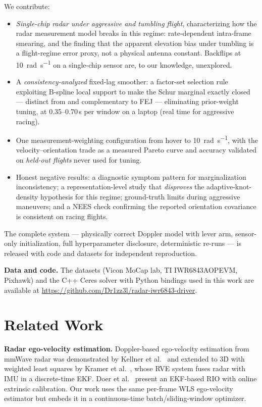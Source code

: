 \documentclass[conference]{IEEEtran}
\begin{document}
We contribute:
\begin{itemize}
  \item \emph{Single-chip radar under aggressive and tumbling flight},
        characterizing how the radar measurement model breaks in this
        regime: rate-dependent intra-frame smearing, and the finding
        that the apparent elevation bias under tumbling is a
        flight-regime error proxy, not a physical antenna constant.
        Backflips at \SI{10}{\radian\per\second} on a single-chip
        sensor are, to our knowledge, unexplored.
  \item A \emph{consistency-analyzed} fixed-lag smoother: a factor-set
        selection rule exploiting B-spline local support to make the
        Schur marginal exactly closed --- distinct from and
        complementary to FEJ --- eliminating prior-weight tuning, at
        0.35--0.70\,s per window on a laptop (real time for aggressive
        racing).
  \item One measurement-weighting configuration from hover to
        \SI{10}{\radian\per\second}, with the velocity--orientation
        trade as a measured Pareto curve and accuracy validated on
        \emph{held-out flights} never used for tuning.
  \item Honest negative results: a diagnostic symptom pattern for
        marginalization inconsistency; a representation-level study
        that \emph{disproves} the adaptive-knot-density hypothesis for
        this regime; ground-truth limits during aggressive maneuvers;
        and a NEES check confirming the reported orientation covariance
        is consistent on racing flights.
\end{itemize}
The complete system --- physically correct Doppler model with lever
arm, sensor-only initialization, full hyperparameter disclosure,
deterministic re-runs --- is released with code and datasets for
independent reproduction.

\textbf{Data and code.}
The datasets (Vicon MoCap lab, TI IWR6843AOPEVM, Pixhawk) and the
C++ Ceres solver with Python bindings used in this work are available
at \url{https://github.com/Dr1zz3l/radar-iwr6843-driver}.

\section{Related Work}
\label{sec:related}

\textbf{Radar ego-velocity estimation.}
Doppler-based ego-velocity estimation from mmWave radar was
demonstrated by Kellner et al.~\cite{kellner2014instantaneous} and
extended to 3D with weighted least squares by
Kramer et al.~\cite{kramer2020rve}, whose RVE system fuses radar
with IMU in a discrete-time EKF.  Doer et
al.~\cite{doer2020ekf} present an EKF-based RIO with online
extrinsic calibration. Our work uses the same per-frame WLS
ego-velocity estimator but embeds it in a continuous-time
batch/sliding-window optimizer.
\end{document}
